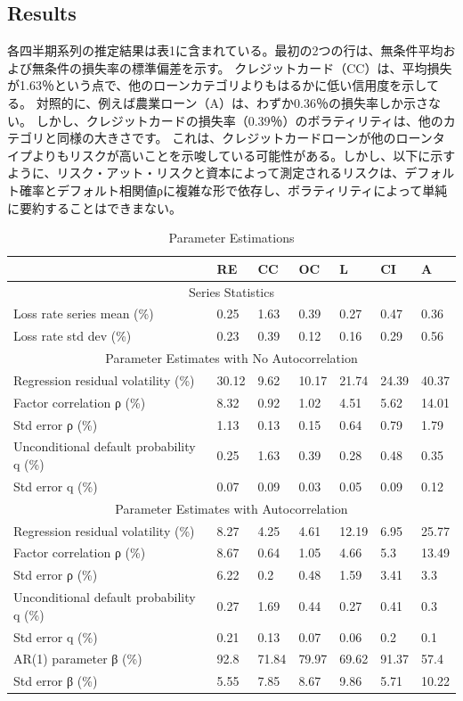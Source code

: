 \documentclass[a4j,12pt]{jarticle}
\begin{document}
\subsection{Results}
各四半期系列の推定結果は表1に含まれている。最初の2つの行は、無条件平均および無条件の損失率の標準偏差を示す。 クレジットカード（CC）は、平均損失が1.63％という点で、他のローンカテゴリよりもはるかに低い信用度を示してる。 対照的に、例えば農業ローン（A）は、わずか0.36％の損失率しか示さない。 しかし、クレジットカードの損失率（0.39％）のボラティリティは、他のカテゴリと同様の大きさです。 これは、クレジットカードローンが他のローンタイプよりもリスクが高いことを示唆している可能性がある。しかし、以下に示すように、リスク・アット・リスクと資本によって測定されるリスクは、デフォルト確率とデフォルト相関値ρに複雑な形で依存し、ボラティリティによって単純に要約することはできまない。
\begin{table}[H]
\begin{center}
\caption{Parameter Estimations}
\begin{tabular}{|l|l|l|l|l|l|l|}\hline
 &RE  & CC & OC & L & CI & A\\\hline
\multicolumn{7}{|c|}{Series Statistics} \\\hline
Loss rate series mean (\%) & 0.25 & 1.63 & 0.39 & 0.27 & 0.47 & 0.36\\\hline
Loss rate std dev (\%) & 0.23 & 0.39 & 0.12 & 0.16 & 0.29 & 0.56\\\hline
\multicolumn{7}{|c|}{Parameter Estimates with No Autocorrelation } \\\hline
Regression residual volatility (\%) & 30.12 & 9.62 & 10.17 & 21.74 & 24.39 & 40.37\\\hline
Factor correlation ρ (\%) & 8.32 & 0.92 & 1.02 & 4.51 & 5.62 & 14.01\\\hline
Std error ρ (\%) & 1.13 & 0.13 & 0.15 & 0.64 & 0.79 & 1.79\\\hline
Unconditional default probability q (\%) & 0.25 & 1.63 & 0.39 & 0.28 & 0.48 & 0.35\\
Std error q (\%) & 0.07 & 0.09 & 0.03 & 0.05 & 0.09 & 0.12\\\hline
\multicolumn{7}{|c|}{Parameter Estimates with Autocorrelation } \\\hline
Regression residual volatility (\%) & 8.27 & 4.25 & 4.61 & 12.19 & 6.95 & 25.77\\\hline
Factor correlation ρ (\%) & 8.67 & 0.64 & 1.05 & 4.66 & 5.3 & 13.49\\\hline
Std error ρ (\%) & 6.22 & 0.2 & 0.48 & 1.59 & 3.41 & 3.3\\\hline
Unconditional default probability q (\%) & 0.27 & 1.69 & 0.44 & 0.27 & 0.41 & 0.3\\\hline
Std error q (\%) & 0.21 & 0.13 & 0.07 & 0.06 & 0.2 & 0.1\\\hline
AR(1) parameter β  (\%) & 92.8 & 71.84 & 79.97 & 69.62 & 91.37 & 57.4\\\hline
Std error β  (\%) & 5.55 & 7.85 & 8.67 & 9.86 & 5.71 & 10.22\\\hline
\end{tabular}
\end{center}
\end{table}
\end{document}
